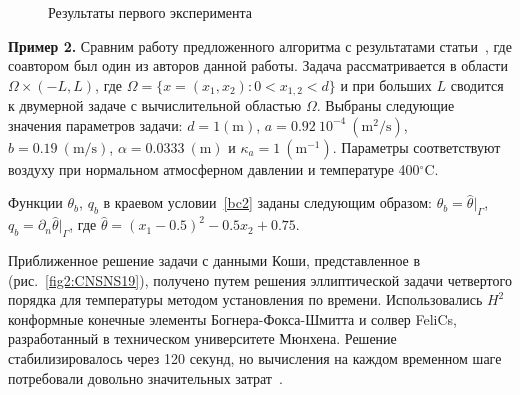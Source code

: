 \documentclass[12pt]{article}
\begin{document}
    \begin{figure}[H]
        \centering
        \caption{Результаты первого эксперимента}
    \end{figure}

    \textbf{Пример 2.}
    Сравним работу предложенного алгоритма с результатами статьи~\cite{CNSNS19}, где
    соавтором был один из авторов данной работы.
    Задача рассматривается в области $\Omega\times (-L,L)$, где $\Omega = \{ x = (x_1,x_2) \colon 0 < x_{1,2} < d\}$
    и при больших $L$ сводится к двумерной задаче с вычислительной областью $\Omega$.
    Выбраны следующие значения параметров задачи: $d = \mathrm{1(m)}$, $a = 0.92~10^{-4}~\mathrm{(m^2/s)}$, $b=
    0.19~\mathrm{(m/s)}$, $\alpha = 0.0333~\mathrm{(m)}$ и $\kappa_a = 1~\mathrm{(m^{-1})}$.
    Параметры соответствуют воздуху при нормальном атмосферном давлении и температуре 400$^\circ$C\@.

    Функции $\theta_b$, $q_b$ в краевом условии~\eqref{bc2} заданы следующим образом:
    $\theta_b = \widehat{\theta}|_{\Gamma}$, $q_b = \partial_n \widehat{\theta}|_{\Gamma}$, где
    $\widehat{\theta} = (x_1-0.5)^2 - 0.5x_2+0.75$.

    Приближенное решение задачи с данными Коши, представленное в~\cite{CNSNS19} (рис.~\ref{fig2:CNSNS19}),
    получено путем решения эллиптической задачи четвертого
    порядка для температуры методом установления по времени.
    Использовались $H^2$ конформные конечные элементы Богнера-Фокса-Шмитта и
    солвер FeliCs, разработанный в техническом университете Мюнхена.
    Решение стабилизировалось через 120 секунд, но вычисления на каждом временном
    шаге потребовали довольно значительных затрат~\cite{CNSNS19}.
\end{document}
